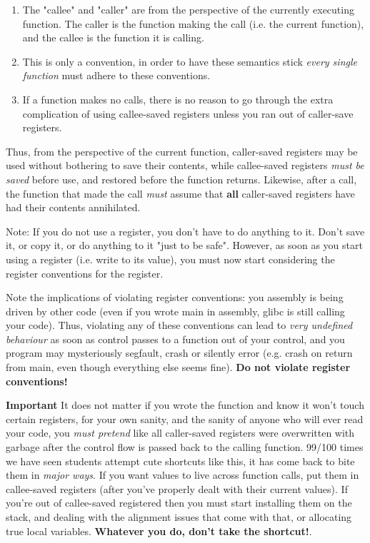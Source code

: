 \documentclass[11pt]{article}
\begin{document}
\begin{enumerate}
    \item The "callee" and "caller" are from the perspective of the currently executing
        function. The caller is the function making the call (i.e. the current function),
        and the callee is the function it is calling.
    \item This is only a convention, in order to have these semantics stick \emph{every
        single function} must adhere to these conventions.
    \item If a function makes no calls, there is no reason to go through the extra
        complication of using callee-saved registers unless you ran out of caller-save
        registers.
\end{enumerate}

Thus, from the perspective of the current function, caller-saved registers may be used
without bothering to save their contents, while callee-saved registers \emph{must be
saved} before use, and restored before the function returns. Likewise, after a call, the
function that made the call \emph{must} assume that \textbf{all} caller-saved registers
have had their contents annihilated.

Note: If you do not use a register, you don't have to do anything to it. Don't save it, or
copy it, or do anything to it "just to be safe". However, as soon as you start using a
register (i.e. write to its value), you must now start considering the register
conventions for the register.

Note the implications of violating register conventions: you assembly is being driven by
other code (even if you wrote main in assembly, glibc is still calling your code). Thus,
violating any of these conventions can lead to \emph{very undefined behaviour} as soon as
control passes to a function out of your control, and you program may mysteriously
segfault, crash or silently error (e.g. crash on return from main, even though everything
else seems fine). \textbf{Do not violate register conventions!}

\textbf{Important} It does not matter if you wrote the function and know it won't touch
certain registers, for your own sanity, and the sanity of anyone who will ever read your
code, you \emph{must pretend} like all caller-saved registers were overwritten with
garbage after the control flow is passed back to the calling function. 99/100 times we
have seen students attempt cute shortcuts like this, it has come back to bite them in
\emph{major ways}. If you want values to live across function calls, put them in
callee-saved registers (after you've properly dealt with their current values). If you're
out of callee-saved registered then you must start installing them on the stack, and
dealing with the alignment issues that come with that, or allocating true local variables.
\textbf{Whatever you do, don't take the shortcut!}.
\end{document}
